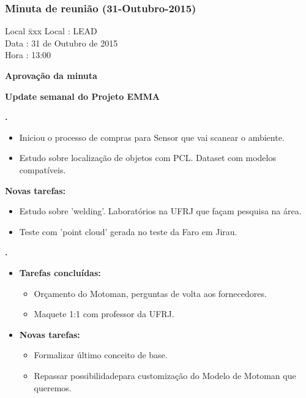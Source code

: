 \subsubsection{Minuta de reunião (31-Outubro-2015)}

\begin{tabbing}
  Local \= xxx \kill
  Local \> : LEAD \\
  Data  \> : 31 de Outubro de 2015 \\
  Hora  \> : 13:00
\end{tabbing}


\textbf{Aprovação da minuta}

\textbf{Update semanal do Projeto EMMA}
   									
						
\textbf{\gabriel.} 
	\begin{itemize}
			\item Iniciou o processo de compras para Sensor que vai scanear o ambiente.
			\item Estudo sobre localização de objetos com PCL. Dataset com modelos
			compatíveis.
			\end{itemize}
		
		\item \textbf{Novas tarefas:}
			\begin{itemize} 
				\item Estudo sobre 'welding'. Laboratórios na UFRJ que façam pesquisa na
				área.
				\item Teste com 'point cloud' gerada no teste da Faro em Jirau.
			\end{itemize}

					
			
   \textbf{.} 
	\begin{itemize}
		\item \textbf{Tarefas concluídas:}
			\begin{itemize}    
				\item Orçamento do Motoman, perguntas de volta aos fornecedores.
				\item Maquete 1:1 com professor da UFRJ.
				
			\end{itemize}
		
		\item \textbf{Novas tarefas:}
			\begin{itemize} 
			    \item Formalizar último conceito de base.
			    \item Repassar possibilidadepara customização do Modelo de Motoman que
			    queremos.
			\end{itemize}
	\end{itemize}

